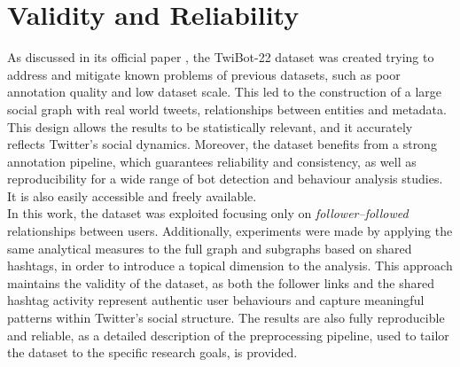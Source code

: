 \documentclass[12pt, a4paper]{article}
\begin{document}
\section{Validity and Reliability} \label{validity-and-reliability-not-needed-for-the-project-proposal}
	As discussed in its official paper \cite{twibot22}, the TwiBot-22 dataset was created trying to address and mitigate known problems of previous datasets, such as poor annotation quality and low dataset scale. This led to the construction of a large social graph with real world tweets, relationships between entities and metadata. This design allows the results to be statistically relevant, and it accurately reflects Twitter’s social dynamics. Moreover, the dataset benefits from a strong annotation pipeline, which guarantees reliability and consistency, as well as reproducibility for a wide range of bot detection and behaviour analysis studies. It is also easily accessible and freely available.\\
    In this work, the dataset was exploited focusing only on \textit{follower--followed} relationships between users. Additionally, experiments were made by applying the same analytical measures to the full graph and subgraphs based on shared hashtags, in order to introduce a topical dimension to the analysis. This approach maintains the validity of the dataset, as both the follower links and the shared hashtag activity represent authentic user behaviours and capture meaningful patterns within Twitter’s social structure. The results are also fully reproducible and reliable, as a detailed description of the preprocessing pipeline, used to tailor the dataset to the specific research goals, is provided.
\end{document}
